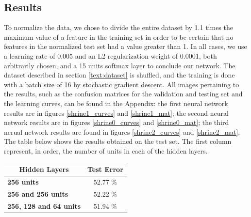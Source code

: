 \begin{multicols}{2}
\subsection{Results}
To normalize the data, we chose to divide the entire dataset by 1.1 times the maximum value of a feature in the training set in order to be certain that no features in the normalized test set had a value greater than 1. In all cases, we use a learning rate of 0.005 and an L2 regularization weight of 0.0001, both arbitrarily chosen, and a 15 units softmax layer to conclude our network. The dataset described in section \ref{text:dataset} is shuffled, and the training is done with a batch size of 16 by stochastic gradient descent. All images pertaining to the results, such as the confusion matrices for the validation and testing set and the learning curves, can be found in the Appendix: the first neural network results are in figures \ref{shrine1_curves} and \ref{shrine1_mat}; the second neural network results are in figures \ref{shrine0_curves} and \ref{shrine0_mat}; the third nerual network results are found in figures \ref{shrine2_curves} and \ref{shrine2_mat}. The table below shows the results obtained on the test set. The first column represent, in order, the number of units in each of the hidden layers. 

\begin{center}
\begin{tabular}{lc}
\toprule
\multicolumn{1}{c}{\textbf{Hidden Layers}} & \textbf{Test Error} \\
\midrule
\textbf{256 units}                         &   52.77 \%          \\
\textbf{256 and 256 units}                 &   52.22 \%          \\
\textbf{256, 128 and 64 units}             &   51.94 \%       \\ \bottomrule
\end{tabular}
\end{center}


\end{multicols}
